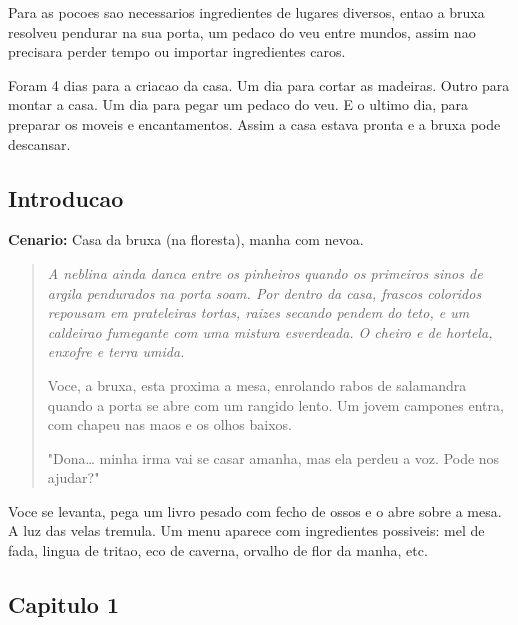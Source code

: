 \documentclass[12pt]{article}
\begin{document}
\vspace{0.2cm}

\noindent Para as pocoes sao necessarios ingredientes de lugares diversos, entao a bruxa resolveu pendurar na sua porta, um pedaco do veu entre mundos, assim nao precisara perder tempo ou importar ingredientes caros.

\vspace{0.2cm}

\noindent Foram 4 dias para a criacao da casa. Um dia para cortar as madeiras. Outro para montar a casa. Um dia para pegar um pedaco do veu. E o ultimo dia, para preparar os moveis e encantamentos. Assim a casa estava pronta e a bruxa pode descansar.

\subsection{Introducao}

\textbf{Cenario:} Casa da bruxa (na floresta), manha com nevoa.

\vspace{0.3cm}

\begin{quote}
\itshape
A neblina ainda danca entre os pinheiros quando os primeiros sinos de argila pendurados na porta soam. Por dentro da casa, frascos coloridos repousam em prateleiras tortas, raizes secando pendem do teto, e um caldeirao fumegante com uma mistura esverdeada. O cheiro e de hortela, enxofre e terra umida.

\vspace{0.3cm}

\noindent Voce, a bruxa, esta proxima a mesa, enrolando rabos de salamandra quando a porta se abre com um rangido lento. Um jovem campones entra, com chapeu nas maos e os olhos baixos.

\vspace{0.3cm}

\noindent "Dona… minha irma vai se casar amanha, mas ela perdeu a voz. Pode nos ajudar?"
\end{quote}

\vspace{0.3cm}

\noindent Voce se levanta, pega um livro pesado com fecho de ossos e o abre sobre a mesa. A luz das velas tremula. Um menu aparece com ingredientes possiveis: mel de fada, lingua de tritao, eco de caverna, orvalho de flor da manha, etc.

\newpage

\subsection{Capitulo 1}
\end{document}
